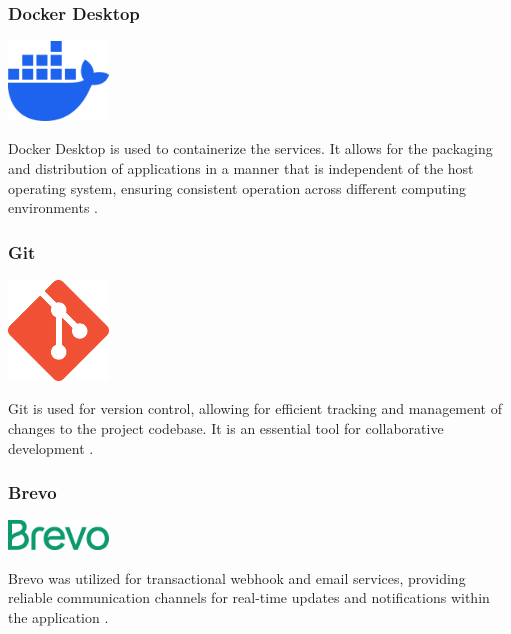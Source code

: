 \subsubsection*{Docker Desktop}
\begin{center}
\includegraphics[width=0.2\textwidth]{Images/logos/docker-mark-blue.png}
\label{fig:docker}
\end{center}
Docker Desktop is used to containerize the services. It allows for the packaging and distribution of applications in a manner that is independent of the host operating system, ensuring consistent operation across different computing environments \cite{docker}.

\subsubsection*{Git}
\begin{center}
\includegraphics[width=0.2\textwidth]{Images/logos/Git-Icon-1788C.png}
\label{fig:git}
\end{center}
Git is used for version control, allowing for efficient tracking and management of changes to the project codebase. It is an essential tool for collaborative development \cite{git}.

\subsubsection*{Brevo}
\begin{center}
\includegraphics[width=0.2\textwidth]{Images/logos/Brevo-Logo.png}
\label{fig:brevo}
\end{center}
Brevo was utilized for transactional webhook and email services, providing reliable communication channels for real-time updates and notifications within the application \cite{brevo}.

